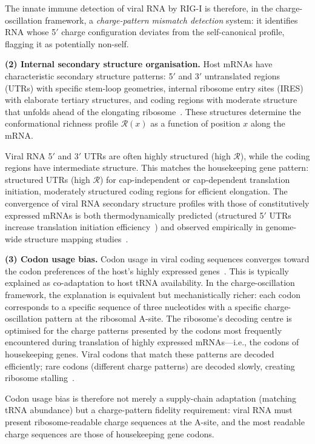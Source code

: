 \documentclass[12pt,a4paper]{article}
\theoremstyle{definition}
\theoremstyle{remark}
\newcommand{\Rcat}{\mathcal{R}}
\begin{document}
The innate immune detection of viral RNA by RIG-I is therefore, in the charge-oscillation framework, a \emph{charge-pattern mismatch detection} system: it identifies RNA whose 5$'$ charge configuration deviates from the self-canonical profile, flagging it as potentially non-self.

\textbf{(2) Internal secondary structure organisation.}
Host mRNAs have characteristic secondary structure patterns: 5$'$ and 3$'$ untranslated regions (UTRs) with specific stem-loop geometries, internal ribosome entry sites (IRES) with elaborate tertiary structures, and coding regions with moderate structure that unfolds ahead of the elongating ribosome~\cite{Spitale2015,Incarnato2016}. These structures determine the conformational richness profile $\Rcat(x)$ as a function of position $x$ along the mRNA.

Viral RNA 5$'$ and 3$'$ UTRs are often highly structured (high $\Rcat$), while the coding regions have intermediate structure. This matches the housekeeping gene pattern: structured UTRs (high $\Rcat$) for cap-independent or cap-dependent translation initiation, moderately structured coding regions for efficient elongation. The convergence of viral RNA secondary structure profiles with those of constitutively expressed mRNAs is both thermodynamically predicted (structured 5$'$ UTRs increase translation initiation efficiency~\cite{Kozak1989}) and observed empirically in genome-wide structure mapping studies~\cite{Watts2009,Huber2019}.

\textbf{(3) Codon usage bias.}
Codon usage in viral coding sequences converges toward the codon preferences of the host's highly expressed genes~\cite{Nakamura2000,Karlin2001}. This is typically explained as co-adaptation to host tRNA availability. In the charge-oscillation framework, the explanation is equivalent but mechanistically richer: each codon corresponds to a specific sequence of three nucleotides with a specific charge-oscillation pattern at the ribosomal A-site. The ribosome's decoding centre is optimised for the charge patterns presented by the codons most frequently encountered during translation of highly expressed mRNAs---i.e., the codons of housekeeping genes. Viral codons that match these patterns are decoded efficiently; rare codons (different charge patterns) are decoded slowly, creating ribosome stalling~\cite{Presnyak2015}.

Codon usage bias is therefore not merely a supply-chain adaptation (matching tRNA abundance) but a charge-pattern fidelity requirement: viral RNA must present ribosome-readable charge sequences at the A-site, and the most readable charge sequences are those of housekeeping gene codons.
\end{document}
